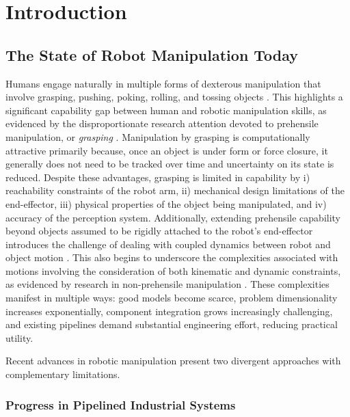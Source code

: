 \chapter{Introduction}
\label{ch:introduction}

\section{The State of Robot Manipulation Today}
\label{sec:intro:state}

Humans engage naturally in multiple forms of dexterous manipulation that involve grasping, pushing, poking, rolling, and tossing objects \cite{bullock2011classifying}.
This highlights a significant capability gap between human and robotic manipulation skills, as evidenced by the disproportionate research attention devoted to prehensile manipulation, or \textsl{grasping} \cite{billard2019trends}.
Manipulation by grasping is computationally attractive primarily because, once an object is under form or force closure, it generally does not need to be tracked over time and uncertainty on its state is reduced.
Despite these advantages, grasping is limited in capability by i) reachability constraints of the robot arm, ii) mechanical design limitations of the end-effector, iii) physical properties of the object being manipulated, and iv) accuracy of the perception system.
Additionally, extending prehensile capability beyond objects assumed to be rigidly attached to the robot's end-effector introduces the challenge of dealing with coupled dynamics between robot and object motion \cite{yin2021modeling,ichnowski2022gomp}.
This also begins to underscore the complexities associated with motions involving the consideration of both kinematic and dynamic constraints, as evidenced by research in non-prehensile manipulation \cite{ruggiero2018nonprehensile}.
These complexities manifest in multiple ways: good models become scarce, problem dimensionality increases exponentially, component integration grows increasingly challenging, and existing pipelines demand substantial engineering effort, reducing practical utility.

Recent advances in robotic manipulation present two divergent approaches with complementary limitations.

\subsection{Progress in Pipelined Industrial Systems}
\label{sec:intro:industrial}

